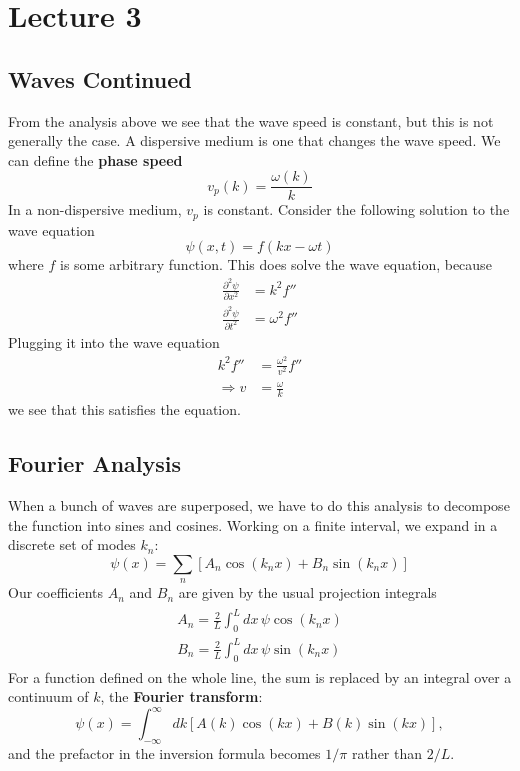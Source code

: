\documentclass{report}
\numberwithin{equation}{section}
\begin{document}
\section{Lecture 3}
\subsection{Waves Continued}
From the analysis above we see that the wave speed is constant, but this is not generally the case. A dispersive medium is one that changes the wave speed. We can define the \textbf{phase speed}
\begin{equation}
	v_p(k) = \frac{\omega(k)}{k}
\end{equation}
In a non-dispersive medium, $v_p$ is constant. Consider the following solution to the wave equation
\begin{equation}
	\psi(x,t) = f(kx-\omega t)
\end{equation}
where $f$ is some arbitrary function. This does solve the wave equation, because
\begin{align*}
	\frac{\partial^2\psi}{\partial x^2}& = k^2f''\\
	\frac{\partial^2\psi}{\partial t^2} &= \omega^2 f''
\end{align*}
Plugging it into the wave equation
\begin{align*}
	k^2f'' &= \frac{\omega^2}{v^2}f''\\
	\Rightarrow v&=\frac{\omega}{k}
\end{align*}
we see that this satisfies the equation.
\subsection{Fourier Analysis}
When a bunch of waves are superposed, we have to do this analysis to decompose the function into sines and cosines. Working on a finite interval, we expand in a discrete set of modes $k_n$:
\begin{equation}
	\psi(x) =\sum_{n} \left[A_n\cos(k_n x)+B_n\sin(k_n x)\right]
\end{equation}
Our coefficients $A_n$ and $B_n$ are given by the usual projection integrals
\begin{align}
\begin{split}
	A_n = \frac{2}{L}\int_0^L dx\,\psi\cos(k_n x)\\
	B_n = \frac{2}{L}\int_0^L dx\,\psi\sin(k_n x)
\end{split}
\end{align}
For a function defined on the whole line, the sum is replaced by an integral over a continuum of $k$, the \textbf{Fourier transform}:
\begin{equation}
	\psi(x) =\int^{\infty}_{-\infty} dk\left[A(k)\cos(kx)+B(k)\sin(kx)\right],
\end{equation}
and the prefactor in the inversion formula becomes $1/\pi$ rather than $2/L$.
\end{document}
